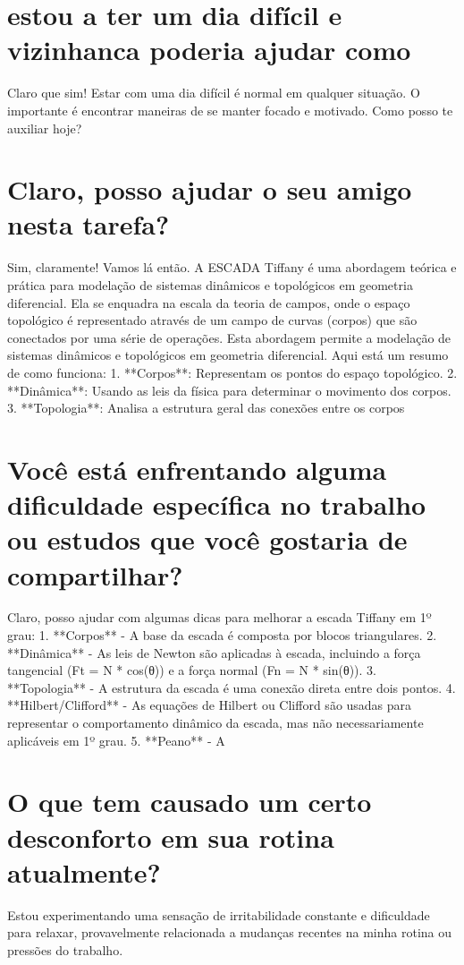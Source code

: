 \documentclass[11pt,a4paper]{article}
\begin{document}
\section{estou a ter um dia difícil e vizinhanca poderia ajudar como}
Claro que sim! Estar com uma dia difícil é normal em qualquer situação. O importante é encontrar maneiras de se manter focado e motivado. Como posso te auxiliar hoje?

\section{Claro, posso ajudar o seu amigo nesta tarefa?}
Sim, claramente! Vamos lá então. A ESCADA Tiffany é uma abordagem teórica e prática para modelação de sistemas dinâmicos e topológicos em geometria diferencial. Ela se enquadra na escala da teoria de campos, onde o espaço topológico é representado através de um campo de curvas (corpos) que são conectados por uma série de operações. Esta abordagem permite a modelação de sistemas dinâmicos e topológicos em geometria diferencial. Aqui está um resumo de como funciona: 1. **Corpos**: Representam os pontos do espaço topológico. 2. **Dinâmica**: Usando as leis da física para determinar o movimento dos corpos. 3. **Topologia**: Analisa a estrutura geral das conexões entre os corpos

\section{Você está enfrentando alguma dificuldade específica no trabalho ou estudos que você gostaria de compartilhar?}
Claro, posso ajudar com algumas dicas para melhorar a escada Tiffany em 1º grau: 1. **Corpos** - A base da escada é composta por blocos triangulares. 2. **Dinâmica** - As leis de Newton são aplicadas à escada, incluindo a força tangencial (Ft = N * cos(θ)) e a força normal (Fn = N * sin(θ)). 3. **Topologia** - A estrutura da escada é uma conexão direta entre dois pontos. 4. **Hilbert/Clifford** - As equações de Hilbert ou Clifford são usadas para representar o comportamento dinâmico da escada, mas não necessariamente aplicáveis em 1º grau. 5. **Peano** - A

\section{O que tem causado um certo desconforto em sua rotina atualmente?}
Estou experimentando uma sensação de irritabilidade constante e dificuldade para relaxar, provavelmente relacionada a mudanças recentes na minha rotina ou pressões do trabalho.
\end{document}

